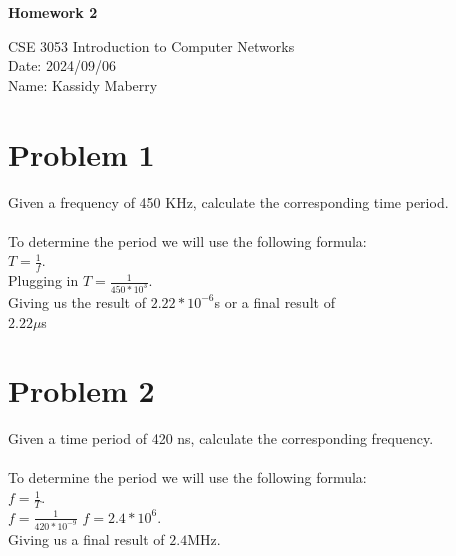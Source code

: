 \documentclass{article}
\begin{document}
\newcommand{\PLtitle}{\setlength{\parindent}{0pt}
\begin{center}

  \huge{\textbf{\Ltitle\\}}
  \normalsize 

  CSE 3053 Introduction to Computer Networks \\
  Date: \date\\
  Name: Kassidy Maberry\\
\end{center}
}

\def\Ltitle{Homework 2}
\def\author{Kassidy Maberry}
\def\date{2024/09/06}
\def\subP{\hspace{20mm}}

\PLtitle

\section*{Problem 1} %
Given a frequency of 450 KHz, calculate the corresponding time period.\\\\

To determine the period we will use the following formula:\\
$T = \frac{1}{f}$.\\
Plugging in $T = \frac{1}{450 * 10^{3}}$.\\
Giving us the result of $2.22 *10^{-6}$s or a final result of\\
$2.22\mu$s

\section*{Problem 2} %
Given a time period of 420 ns, calculate the corresponding frequency.\\\\
To determine the period we will use the following formula:\\
$f = \frac{1}{T}$.\\
$f = \frac{1}{420 * 10^{-9}}$
$f = 2.4 * 10^{6}$.\\
Giving us a final result of $2.4$MHz.\\
\end{document}
